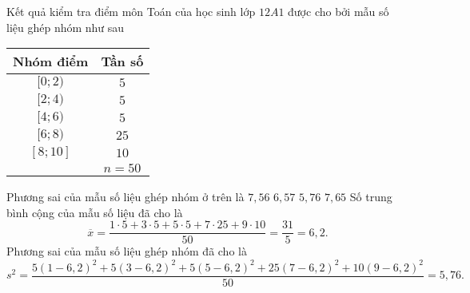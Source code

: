 \begin{ex}%
	Kết quả kiểm tra điểm môn Toán của học sinh lớp $12A1$ được cho bởi mẫu số liệu ghép nhóm như sau
	\begin{center}
		\begin{tabular}{|c|c|}
			\hline
			\textbf{Nhóm điểm} & \textbf{Tần số} \\
			\hline $[0;2)$     & $5$             \\
			\hline $[2;4)$     & $5$             \\
			\hline $[4;6)$     & $5$             \\
			\hline $[6;8)$     & $25$            \\
			\hline $[8;10]$    & $10$            \\
			\hline             & $n=50$          \\
			\hline
		\end{tabular}
	\end{center}
	Phương sai của mẫu số liệu ghép nhóm ở trên là
	\choice
	{$7{,}56$}
	{$6{,}57$}
	{\True $5{,}76$}
	{$7{,}65$}
	\loigiai
	{
	Số trung bình cộng của mẫu số liệu đã cho là
	\[\overline{x}=\dfrac{1\cdot 5+3\cdot 5+5\cdot 5+7\cdot 25+9\cdot 10}{50}=\dfrac{31}{5}=6{,}2.\]
	Phương sai của mẫu số liệu ghép nhóm đã cho là
	\[s^2=\dfrac{5(1-6{,}2)^2+5(3-6{,}2)^2+5(5-6{,}2)^2+25(7-6{,}2)^2+10(9-6{,}2)^2}{50}= 5{,}76.\]
	}
\end{ex}
\TL
